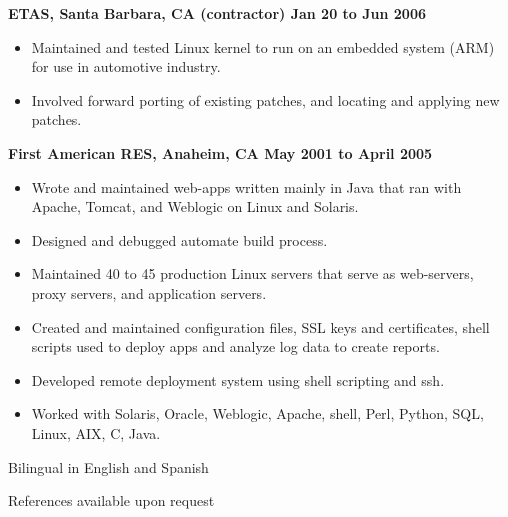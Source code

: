 \documentclass{res}
\begin{document}
\begin{resume}
\begin{itemize}
\end{itemize}

{\large \bf ETAS, Santa Barbara, CA (contractor) \hfill Jan 20 to Jun 2006}
\begin{itemize}

\item Maintained and tested Linux kernel to run on an embedded system
(ARM) for use in automotive industry.

\item Involved forward porting of existing patches, and locating and
applying new patches.

\end{itemize}


{\large \bf First American RES, Anaheim, CA \hfill May 2001 to April 2005}
\begin{itemize}

\item Wrote and maintained web-apps written mainly in Java that ran with
Apache, Tomcat, and Weblogic on Linux and Solaris.

\item Designed and debugged automate build process.

\item Maintained 40 to 45 production Linux servers that serve as
web-servers, proxy servers, and application servers.

\item Created and maintained configuration files, SSL keys and
certificates, shell scripts used to deploy apps and analyze log data to
create reports.

\item Developed remote deployment system using shell scripting and ssh.

\item  Worked with Solaris, Oracle, Weblogic, Apache, shell, Perl,
Python, SQL, Linux, AIX, C, Java.

\end{itemize}


Bilingual in English and Spanish

References available upon request

\end{resume}
\end{document}
